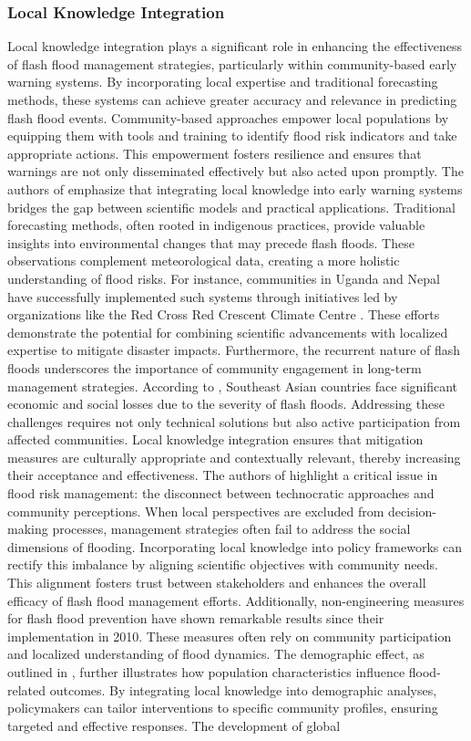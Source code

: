 \subsubsection{Local Knowledge Integration}
Local knowledge integration plays a significant role in enhancing the effectiveness of flash flood management strategies, particularly within community-based early warning systems. By incorporating local expertise and traditional forecasting methods, these systems can achieve greater accuracy and relevance in predicting flash flood events. Community-based approaches empower local populations by equipping them with tools and training to identify flood risk indicators and take appropriate actions. This empowerment fosters resilience and ensures that warnings are not only disseminated effectively but also acted upon promptly. The authors of emphasize that integrating local knowledge into early warning systems bridges the gap between scientific models and practical applications. Traditional forecasting methods, often rooted in indigenous practices, provide valuable insights into environmental changes that may precede flash floods. These observations complement meteorological data, creating a more holistic understanding of flood risks. For instance, communities in Uganda and Nepal have successfully implemented such systems through initiatives led by organizations like the Red Cross Red Crescent Climate Centre \citep{Msigwa2024}. These efforts demonstrate the potential for combining scientific advancements with localized expertise to mitigate disaster impacts. Furthermore, the recurrent nature of flash floods underscores the importance of community engagement in long-term management strategies. According to \citep{Saad2024}, Southeast Asian countries face significant economic and social losses due to the severity of flash floods. Addressing these challenges requires not only technical solutions but also active participation from affected communities. Local knowledge integration ensures that mitigation measures are culturally appropriate and contextually relevant, thereby increasing their acceptance and effectiveness. The authors of \citep{Bodoque2019} highlight a critical issue in flood risk management: the disconnect between technocratic approaches and community perceptions. When local perspectives are excluded from decision-making processes, management strategies often fail to address the social dimensions of flooding. Incorporating local knowledge into policy frameworks can rectify this imbalance by aligning scientific objectives with community needs. This alignment fosters trust between stakeholders and enhances the overall efficacy of flash flood management efforts. Additionally, non-engineering measures for flash flood prevention have shown remarkable results since their implementation in 2010. These measures often rely on community participation and localized understanding of flood dynamics. The demographic effect, as outlined in \citep{Wang2023}, further illustrates how population characteristics influence flood-related outcomes. By integrating local knowledge into demographic analyses, policymakers can tailor interventions to specific community profiles, ensuring targeted and effective responses. The development of global 